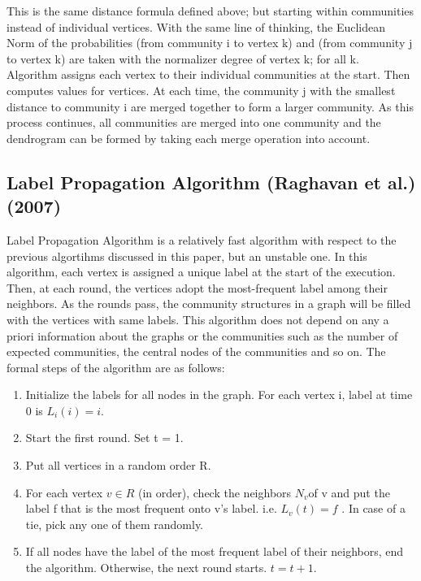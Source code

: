 \documentclass[10pt]{article}
\begin{document}
This is the same distance formula defined above; but starting within communities instead of individual vertices. With the same line of thinking, the Euclidean Norm of the probabilities (from community i to vertex k) and (from community j to vertex k) are taken with the normalizer degree of vertex k; for all k. \\

Algorithm assigns each vertex to their individual communities at the start. Then computes values for vertices. At each time, the community j with the smallest distance to community i are
merged together to form a larger community. As this process continues, all communities are merged into one community and the dendrogram can be formed by taking each merge operation into account. \\

\subsection{Label Propagation Algorithm (Raghavan et al.) (2007)}

Label Propagation Algorithm is a relatively fast algorithm with respect to the previous algortihms discussed in this paper, but an unstable one. In this algorithm, each vertex is assigned a unique label at the start of the execution. Then, at each round, the vertices adopt the most-frequent label among their neighbors. As the rounds pass, the community structures in a graph will be filled with the vertices with same labels\cite{raghavan}. This algorithm does not depend on any a priori information about the graphs or the communities such as the number of expected communities, the central nodes of the communities and so on. The formal steps of the algorithm are as follows: \\

\begin{enumerate}
\item Initialize the labels for all nodes in the graph. For each vertex i, label at time 0 is $ L_i\left(i\right) = i$.
\item Start the first round. Set t = 1. 
\item Put all vertices in a random order R.
\item For each vertex $v \in R$ (in order), check the neighbors $N_{v}$of v and put the label f that is the most frequent onto v’s label. i.e. $ L_v\left(t\right) = f$ . In case of a tie, pick any one of them randomly.
\item If all nodes have the label of the most frequent label of their neighbors, end the algorithm. Otherwise, the next round starts. $t = t+1$.
\end{enumerate}
\end{document}

